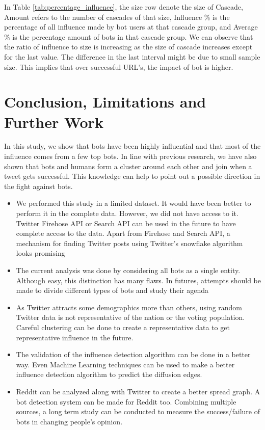 \documentclass[letterpaper]{article}
\begin{document}
In Table \ref{tab:percentage_influence}, the size row denote the size of Cascade, Amount refers to the number of cascades of that size, Influence \% is the percentage of all influence 
made by bot users at that cascade group, and Average \% is the percentage amount of bots in that cascade group. We can observe that the ratio of influence to size is increasing as the 
size of cascade increases except for the last value. The difference in the last interval might be due to small sample size. 
This implies that over successful URL's, the impact of bot is higher.

\section{Conclusion, Limitations and Further Work}
In this study, we show that bots have been highly influential and that most of the influence comes from a few top bots. In line with previous research, we have also shown that bots 
and humans form a cluster around each other and join when a tweet gets successful. This knowledge can help to point out a possible direction in the fight against bots. 

\begin{itemize}
    \item We performed this study in a limited dataset. It would have been better to perform it in the complete data. However, we did not have access to it. 
    Twitter Firehose API or Search API can be used in the future to have complete access to the data. Apart from Firehose and Search API, 
    a mechanism for finding Twitter posts using Twitter's snowflake algorithm looks promising \cite{bettermetrics2019}
    \item The current analysis was done by considering all bots as a single entity. Although easy, this distinction has many flaws. In futures, attempts should be made to 
    divide different types of bots and study their agenda
    \item As Twitter attracts some demographics more than others, using random Twitter data is not representative of the nation or the voting population. 
    Careful clustering can be done to create a representative data to get representative influence in the future.
    \item The validation of the influence detection algorithm can be done in a better way. Even Machine Learning techniques can be used to make a better influence detection algorithm 
    to predict the diffusion edges.
    \item Reddit can be analyzed along with Twitter to create a better spread graph. A bot detection system can be made for Reddit too. Combining multiple sources, a
     long term study can be conducted to measure the success/failure of bots in changing people's opinion.
\end{itemize}



\end{document}
